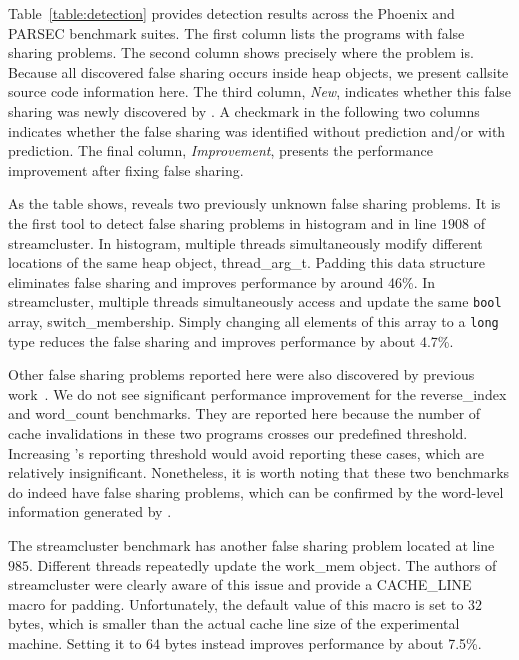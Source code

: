 Table~\ref{table:detection} provides detection results across the Phoenix and PARSEC benchmark suites. 
The first column lists the programs with false sharing problems.  The second column shows precisely where the problem is. Because all discovered false sharing occurs inside heap objects, we present callsite source code information here.  The third column, \emph{New}, indicates whether this false sharing was newly discovered by \Predator{}.  A checkmark in the following two columns indicates whether the false sharing was identified without
prediction and/or with prediction.  The final column, \emph{Improvement}, presents the performance improvement after fixing false sharing.

As the table shows, \Predator{} reveals two previously unknown false sharing problems. It is the first tool to detect false sharing problems in histogram and in line $1908$ of streamcluster. 
In histogram, multiple threads simultaneously modify different locations of the same heap object, thread\_arg\_t. 
Padding this data structure eliminates false sharing and improves performance by around 46\%. In streamcluster, multiple threads simultaneously access and update the same \texttt{bool} array, switch\_membership. Simply changing all elements of this array to a \texttt{long} type reduces the false sharing and improves performance by about 4.7\%.

Other false sharing problems reported here were also discovered by previous work~\cite{sheriff}. We do not see significant performance improvement for the reverse\_index and word\_count benchmarks. They are reported here because the number of cache invalidations in these two programs crosses our predefined threshold.
Increasing \Predator{}'s reporting threshold would avoid reporting these cases, which are relatively insignificant.
Nonetheless, it is worth noting that these two benchmarks do indeed have false sharing problems,
which can be confirmed by the word-level information generated by \Predator{}. 

The streamcluster benchmark has another false sharing problem located at line $985$. Different threads repeatedly update the work\_mem object. The authors of streamcluster were clearly aware of this issue and provide a CACHE\_LINE macro for padding. Unfortunately, the default value of this macro is set to $32$ bytes, which is smaller than the actual cache line size of the experimental machine. Setting it to $64$ bytes instead improves performance by about 7.5\%.

